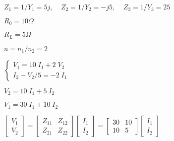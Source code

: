 \documentclass{article}
\def\lthtmlcheckvsize{\ifdim\ht\sizebox<\vsize 
  \ifdim\wd\sizebox<\hsize\expandafter\hfill\fi \expandafter\vfill
  \else\expandafter\vss\fi}%
\begin{document}
{\newpage\clearpage
{}%
$\displaystyle Z_1=1/Y_1=5j,\;\;\;\;Z_2=1/Y_2=-j5,\;\;\;\;Z_3=1/Y_3=25$%
\lthtmlindisplaymathZ
\lthtmlcheckvsize\clearpage}

{\newpage\clearpage
{}%
$ R_0=10\Omega$%
\lthtmlindisplaymathZ
\lthtmlcheckvsize\clearpage}

{\newpage\clearpage
{}%
$ R_L=5\Omega$%
\lthtmlindisplaymathZ
\lthtmlcheckvsize\clearpage}

{\newpage\clearpage
{}%
$ n=n_1/n_2=2$%
\lthtmlindisplaymathZ
\lthtmlcheckvsize\clearpage}

{\newpage\clearpage
{}%
$\displaystyle \left\{ \begin{array}{l}
V_1=10\;I_1+2\;V_2 \\I_2-V_2/5=-2\;I_1 \end{array} \right.$%
\lthtmlindisplaymathZ
\lthtmlcheckvsize\clearpage}

{\newpage\clearpage
{}%
$\displaystyle V_2=10\;I_1+5\;I_2$%
\lthtmlindisplaymathZ
\lthtmlcheckvsize\clearpage}

{\newpage\clearpage
{}%
$\displaystyle V_1=30\;I_1+10\;I_2$%
\lthtmlindisplaymathZ
\lthtmlcheckvsize\clearpage}

{\newpage\clearpage
{}%
$\displaystyle \left[ \begin{array}{l} V_1 \\V_2 \end{array} \right]=
\left[ \begin{array}{rr} Z_{11} & Z_{12} \\Z_{21} & Z_{22} \end{array} \right]
\left[ \begin{array}{l} I_1 \\I_2 \end{array} \right]
=	\left[ \begin{array}{rr} 30 & 10 \\10 & 5 \end{array} \right]
\left[ \begin{array}{l} I_1 \\I_2 \end{array} \right]$%
\lthtmlindisplaymathZ
\lthtmlcheckvsize\clearpage}
\end{document}
